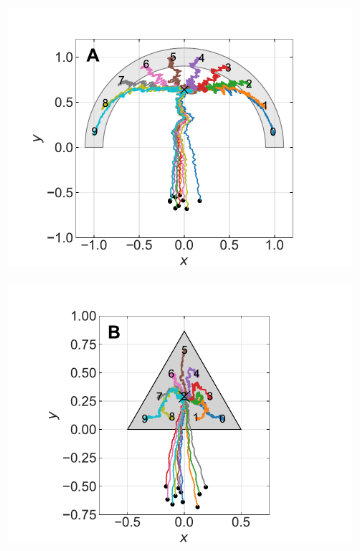 \documentclass[11pt,twocolumn,twoside]{opticajnl}
\begin{document}
\begin{figure}[h]
    \centering
        \begin{subfigure}[b]{\linewidth}
            \centering
            \includegraphics[width=\textwidth]{Figuras/sc_pesos_sigma_0.1_epochs_100000_lr_0.01.pdf}
            \end{subfigure}
         \begin{subfigure}[b]{\linewidth}
            \centering
            \includegraphics[width=\textwidth]{Figuras/tri_pesos_sigma_0.1_epochs_100000_lr_0.01.pdf}
         \end{subfigure}
         \begin{subfigure}[b]{\linewidth}
            \centering

\end{subfigure}
\end{figure}
\end{document}
